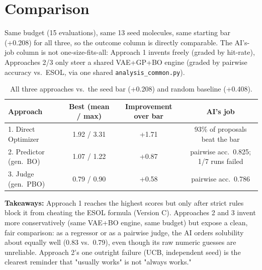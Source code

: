 \section{Comparison}
Same budget (15 evaluations), same 13 seed molecules, same starting bar (+0.208) for all three, so the outcome column is directly comparable. The AI's-job column is not one-size-fits-all: Approach 1 invents freely (graded by hit-rate), Approaches 2/3 only steer a shared VAE+GP+BO engine (graded by pairwise accuracy vs.\ ESOL, via one shared \texttt{analysis\_common.py}).

\begin{table}[h]
\centering
\begin{tabular}{lccc}
\hline
Approach & Best (mean / max) & Improvement over bar & AI's job \\
\hline
1. Direct Optimizer      & 1.92 / 3.31 & +1.71 & 93\% of proposals beat the bar \\
2. Predictor (gen.\ BO)  & 1.07 / 1.22 & +0.87 & pairwise acc.\ 0.825; 1/7 runs failed \\
3. Judge (gen.\ PBO)     & 0.79 / 0.90 & +0.58 & pairwise acc.\ 0.786 \\
\hline
\end{tabular}
\caption{All three approaches vs.\ the seed bar (+0.208) and random baseline (+0.408).}
\label{tab:comparison}
\end{table}

\textbf{Takeaways:} Approach 1 reaches the highest scores but only after strict rules block it from cheating the ESOL formula (Version C). Approaches 2 and 3 invent more conservatively (same VAE+BO engine, same budget) but expose a clean, fair comparison: as a regressor or as a pairwise judge, the AI orders solubility about equally well (0.83 vs.\ 0.79), even though its raw numeric guesses are unreliable. Approach 2's one outright failure (UCB, independent seed) is the clearest reminder that "usually works" is not "always works."
